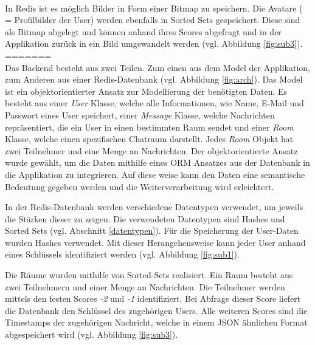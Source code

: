 \\In \acs{Redis} ist es möglich Bilder in Form einer Bitmap zu speichern. Die Avatare ( = Profilbilder der User) werden ebenfalls in Sorted Sets gespeichert. Diese sind als Bitmap abgelegt und können anhand ihres Scores abgefragt und in der Applikation zurück in ein Bild umgewandelt werden (vgl. Abbildung \ref{fig:sub3}).
=======
\\Das Backend besteht aus zwei Teilen. Zum einen aus dem Model der Applikation, zum Anderen aus einer \acs{Redis}-Datenbank (vgl. Abbildung \ref{fig:arch}). Das Model ist ein objektorientierter Ansatz zur Modellierung der benötigten Daten. Es besteht aus einer \textit{User} Klasse, welche alle Informationen, wie Name, E-Mail und Passwort eines User speichert, einer \textit{Message} Klasse, welche Nachrichten repräsentiert, die ein User in einen bestimmten Raum sendet und einer \textit{Room} Klasse, welche einen spezifischen Chatraum darstellt. Jedes \textit{Room} Objekt hat zwei Teilnehmer und eine Menge an Nachrichten. Der objektorientierte Ansatz wurde gewählt, um die Daten mithilfe eines \acs{ORM} Ansatzes aus der Datenbank in die Applikation zu integrieren. Auf diese weise kann den Daten eine semantische Bedeutung gegeben werden und die Weiterverarbeitung wird erleichtert.

In der \acs{Redis}-Datenbank werden verschiedene Datentypen verwendet, um jeweils die Stärken dieser zu zeigen. Die verwendeten Datentypen sind Hashes und Sorted Sets (vgl. Abschnitt \ref{datentypen}). Für die Speicherung der User-Daten wurden Hashes verwendet. Mit dieser Herangehensweise kann jeder User anhand eines Schlüssels identifiziert werden (vgl. Abbildung \ref{fig:sub1}).

Die Räume wurden mithilfe von Sorted-Sets realisiert. Ein Raum besteht aus zwei Teilnehmern und einer Menge an Nachrichten. Die Teilnehmer werden mittels den festen Scores \textit{-2} und \textit{-1} identifiziert. Bei Abfrage dieser Score liefert die Datenbank den Schlüssel des zugehörigen Users. Alle weiteren Scores sind die Timestamps der zugehörigen Nachricht, welche in einem \acs{JSON} ähnlichen Format abgespeichert wird (vgl. Abbildung \ref{fig:sub3}).

